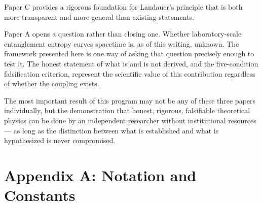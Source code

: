 \documentclass[12pt,letterpaper]{article}
\theoremstyle{plain}
\theoremstyle{definition}
\theoremstyle{remark}
\begin{document}
Paper C provides a rigorous foundation for Landauer's principle that is
both more transparent and more general than existing statements.

Paper A opens a question rather than closing one. Whether laboratory-scale
entanglement entropy curves spacetime is, as of this writing, unknown.
The framework presented here is one way of asking that question precisely
enough to test it. The honest statement of what is and is not derived,
and the five-condition falsification criterion, represent the scientific
value of this contribution regardless of whether the coupling exists.

The most important result of this program may not be any of these three
papers individually, but the demonstration that honest, rigorous,
falsifiable theoretical physics can be done by an independent researcher
without institutional resources --- as long as the distinction between
what is established and what is hypothesized is never compromised.

\newpage
\appendix
\section*{Appendix A: Notation and Constants}
\end{document}
